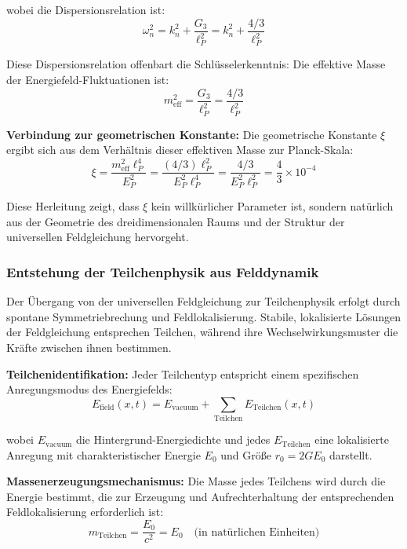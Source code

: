 \documentclass[12pt,a4paper]{article}
\newcommand{\xipar}{\xi}
\begin{document}
	wobei die Dispersionsrelation ist:
	\begin{equation}
		\omega_n^2 = k_n^2 + \frac{G_3}{\ell_P^2} = k_n^2 + \frac{4/3}{\ell_P^2}
	\end{equation}
	
	Diese Dispersionsrelation offenbart die Schlüsselerkenntnis: Die effektive Masse der Energiefeld-Fluktuationen ist:
	\begin{equation}
		m_{\text{eff}}^2 = \frac{G_3}{\ell_P^2} = \frac{4/3}{\ell_P^2}
	\end{equation}
	
	\textbf{Verbindung zur geometrischen Konstante:} Die geometrische Konstante $\xipar$ ergibt sich aus dem Verhältnis dieser effektiven Masse zur Planck-Skala:
	\begin{equation}
		\xipar = \frac{m_{\text{eff}}^2 \ell_P^4}{E_P^2} = \frac{(4/3) \ell_P^2}{E_P^2 \ell_P^4} = \frac{4/3}{E_P^2 \ell_P^2} = \frac{4}{3} \times 10^{-4}
	\end{equation}
	
	Diese Herleitung zeigt, dass $\xipar$ kein willkürlicher Parameter ist, sondern natürlich aus der Geometrie des dreidimensionalen Raums und der Struktur der universellen Feldgleichung hervorgeht.
	
	\subsubsection{Entstehung der Teilchenphysik aus Felddynamik}
	
	Der Übergang von der universellen Feldgleichung zur Teilchenphysik erfolgt durch spontane Symmetriebrechung und Feldlokalisierung. Stabile, lokalisierte Lösungen der Feldgleichung entsprechen Teilchen, während ihre Wechselwirkungsmuster die Kräfte zwischen ihnen bestimmen.
	
	\textbf{Teilchenidentifikation:} Jeder Teilchentyp entspricht einem spezifischen Anregungsmodus des Energiefelds:
	\begin{equation}
		E_{\text{field}}(x,t) = E_{\text{vacuum}} + \sum_{\text{Teilchen}} E_{\text{Teilchen}}(x,t)
	\end{equation}
	
	wobei $E_{\text{vacuum}}$ die Hintergrund-Energiedichte und jedes $E_{\text{Teilchen}}$ eine lokalisierte Anregung mit charakteristischer Energie $E_0$ und Größe $r_0 = 2GE_0$ darstellt.
	
	\textbf{Massenerzeugungsmechanismus:} Die Masse jedes Teilchens wird durch die Energie bestimmt, die zur Erzeugung und Aufrechterhaltung der entsprechenden Feldlokalisierung erforderlich ist:
	\begin{equation}
		m_{\text{Teilchen}} = \frac{E_0}{c^2} = E_0 \quad \text{(in natürlichen Einheiten)}
	\end{equation}
	
\end{document}
